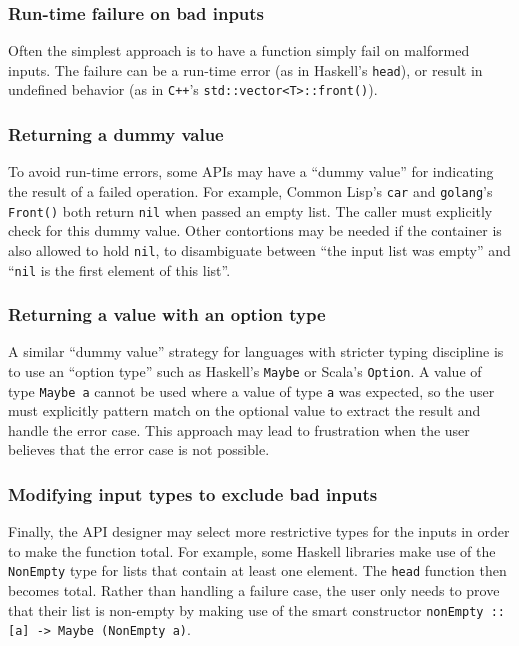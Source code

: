 \documentclass[format=sigplan, review=false, screen=true]{acmart}
\begin{document}
\subsubsection{Run-time failure on bad inputs}
Often the simplest approach is
  to have a function simply fail on malformed inputs. The failure can
  be a run-time error (as in Haskell's \texttt{head}), or result in
  undefined behavior (as in \texttt{C++}'s \texttt{std::vector<T>::front()}).
  
\subsubsection{Returning a dummy value}
  To avoid run-time errors, some APIs may have a ``dummy value''
  for indicating the result of a failed operation. For example, Common Lisp's
  \texttt{car} and \texttt{golang}'s \texttt{Front()} both return \texttt{nil}
  when passed an empty list. The caller must explicitly check for this dummy
  value. Other contortions may be needed if the container is also allowed to
  hold \texttt{nil}, to disambiguate between ``the input list was empty'' and
  ``\texttt{nil} is the first element of this list''.

\subsubsection{Returning a value with an option type}
  A similar ``dummy value'' strategy
  for languages with stricter typing discipline is to use an ``option type'' such
  as Haskell's \texttt{Maybe} or Scala's \texttt{Option}. A value of type \texttt{Maybe a}
  cannot be used where a value of type \texttt{a} was expected, so the user must
  explicitly pattern match on the optional value to extract the result and handle the
  error case. This approach may lead to frustration when the user believes that the
  error case is not possible.
  
\subsubsection{Modifying input types to exclude bad inputs}
Finally, the API designer may select more restrictive types for the inputs in order
to make the function total. For example, some Haskell libraries make use of the
\texttt{NonEmpty} type for lists that contain at least one element. The \texttt{head}
function then becomes total. Rather than handling a failure case, the user only
needs to prove that their list is non-empty by making use of the smart constructor
\texttt{nonEmpty :: [a] -> Maybe (NonEmpty a)}.
\end{document}
